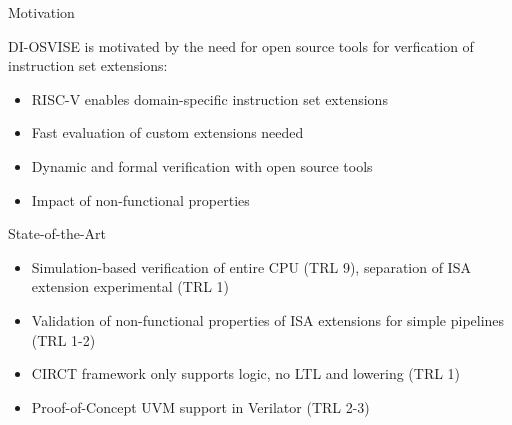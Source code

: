 \documentclass[portrait,a0]{a0poster}
\newcommand{\mainbox}[3]{
    \begin{mdframed}[style=mainbox]
        \begin{center}
            \vspace{5mm}
            {\extrabold \Huge #1}
        \end{center}
        \vspace{5mm}
        \parbox[t][#2][t]{\linewidth}{\large
            #3
        }
    \end{mdframed}
}
\begin{document}
\noindent\begin{minipage}[t]{386mm}
    \mainbox{Motivation}{23cm}{
        DI-OSVISE is motivated by the need for open source tools for verfication of instruction set extensions:
        \begin{itemize}
            \item RISC-V enables domain-specific instruction set extensions
            \item Fast evaluation of custom extensions needed
            \item Dynamic and formal verification with open source tools
            \item Impact of non-functional properties
        \end{itemize}
        \vfill
        \begin{mdframed}[style=highlightbox]
            {\extrabold \Large State-of-the-Art}
            \large
            \begin{itemize}
                \item Simulation-based verification of entire CPU (TRL 9), separation of ISA extension experimental (TRL 1)
                \item Validation of non-functional properties of ISA extensions for simple pipelines (TRL 1-2)
                \item CIRCT framework only supports logic, no LTL and lowering (TRL 1)
                \item Proof-of-Concept UVM support in Verilator (TRL 2-3)
            \end{itemize}
        \end{mdframed}
        \vfill
        }
\end{minipage}%
\hfill
\end{document}
